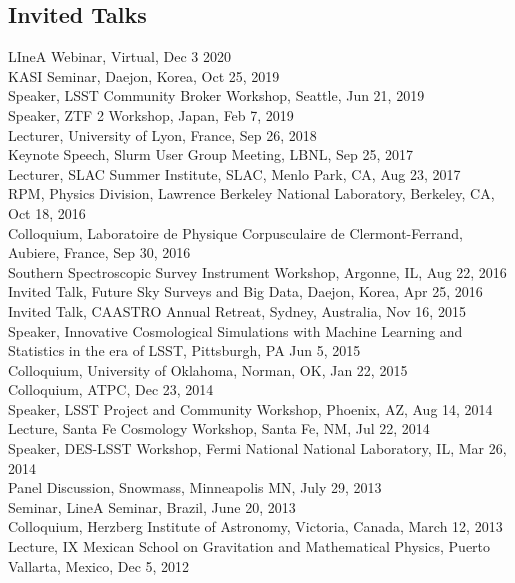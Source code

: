 \documentclass[line, margin]{res}
\begin{document}
\begin{resume}
\section{Invited Talks}
LIneA Webinar, Virtual, Dec 3 2020\\
KASI Seminar, Daejon, Korea, Oct 25, 2019\\
Speaker, LSST Community Broker Workshop, Seattle, Jun 21, 2019\\
Speaker, ZTF 2 Workshop, Japan, Feb 7, 2019\\
Lecturer, University of Lyon, France, Sep 26, 2018 \\
Keynote Speech, Slurm User Group Meeting, LBNL, Sep 25, 2017\\
Lecturer, SLAC Summer Institute, SLAC, Menlo Park, CA, Aug 23, 2017\\
RPM, Physics Division, Lawrence Berkeley National Laboratory, Berkeley, CA, Oct 18, 2016\\
Colloquium, Laboratoire de Physique Corpusculaire de Clermont-Ferrand, Aubiere, France, Sep 30, 2016\\
Southern Spectroscopic Survey Instrument Workshop, Argonne, IL, Aug 22, 2016\\
Invited Talk, Future Sky Surveys and Big Data, Daejon, Korea, Apr 25, 2016\\
Invited Talk, CAASTRO Annual Retreat, Sydney, Australia, Nov 16, 2015\\
Speaker, Innovative Cosmological Simulations with Machine Learning and Statistics in the era of LSST, Pittsburgh, PA  Jun 5, 2015\\
Colloquium, University of Oklahoma, Norman, OK, Jan 22, 2015\\
Colloquium, ATPC, Dec 23, 2014\\
Speaker, LSST Project and Community Workshop, Phoenix, AZ, Aug 14, 2014\\
Lecture, Santa Fe Cosmology Workshop, Santa Fe, NM, Jul 22, 2014\\
Speaker, DES-LSST Workshop, Fermi National National Laboratory, IL, Mar 26, 2014\\
Panel Discussion, Snowmass, Minneapolis MN, July 29, 2013\\
Seminar, LineA Seminar, Brazil, June 20, 2013\\
Colloquium, Herzberg Institute of Astronomy, Victoria, Canada, March 12, 2013\\
Lecture, IX Mexican School on Gravitation and Mathematical Physics, Puerto Vallarta, Mexico, Dec 5, 2012\\

\end{resume}
\end{document}
